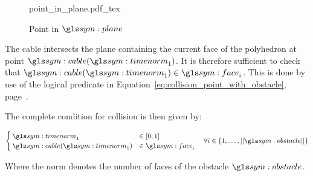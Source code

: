 	\begin{figure}[hbt]
		\centering
		\def\svgwidth{\columnwidth}
		{point_in_plane.pdf_tex}
		\caption{Point in $\plane$}%
		\label{fig:point_in_plane}
	\end{figure}

	The cable intersects the plane containing the current face of the polyhedron
	at point $\cable(\timenorm_1)$. It is therefore sufficient to check that
	$\cable(\timenorm_1) \in \face_i$. This is done by use of the logical
	predicate in Equation~\ref{eq:collision_point_with_obstacle},
	page~\pageref{eq:collision_point_with_obstacle}.

	The complete condition for collision is then given by:

	\begin{equation}
		\begin{cases}
			\timenorm_1 &\in [0, 1]\\
			\cable(\timenorm_1) &\in \face_i
		\end{cases}
		\quad \forall i \in \{1, \ldots, \norm{\obstacle}\}
		\label{eq:cable_obstacle_collision_condition}
	\end{equation}

	Where the norm denotes the number of faces of the obstacle $\obstacle$.
